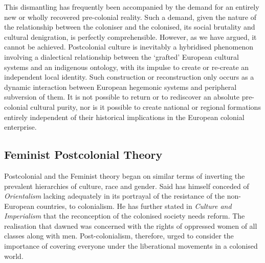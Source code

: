 This dismantling has frequently been accompanied by the demand for an entirely new or wholly recovered pre-colonial reality. Such a demand, given the nature of the relationship between the coloniser and the colonised, its social brutality and cultural denigration, is perfectly comprehensible. However, as we have argued, it cannot be achieved. Postcolonial culture is inevitably a hybridised phenomenon involving a dialectical relationship between the `grafted' European cultural systems and an indigenous ontology, with its impulse to create or re-create an independent local identity. Such construction or reconstruction only occurs as a dynamic interaction between European hegemonic systems and peripheral subversion of them. It is not possible to return or to rediscover an absolute pre-colonial cultural purity, nor is it possible to create national or regional formations entirely independent of their historical implications in the European colonial enterprise. \parencite[195-96]{Griffiths1989}

\subsection{Feminist Postcolonial Theory}

Postcolonial and the Feminist theory began on similar terms of inverting the prevalent hierarchies of culture, race and gender. Said has himself conceded of \emph{Orientalism} lacking adequately in its portrayal of the resistance of the non-European countries, to colonialism. He has further stated in \emph{Culture and Imperialism }that the reconception of the colonised society needs reform. The realisation that dawned was concerned with the rights of oppressed women of all classes along with men. Post-colonialism, therefore, urged to consider the importance of covering everyone under the liberational movements in a colonised world.

